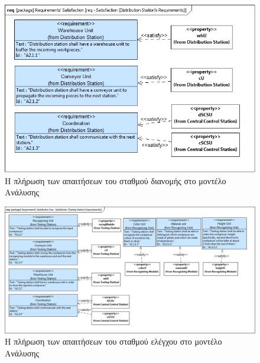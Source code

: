 \documentclass[a4paper,12pt,twoside]{report}
\begin{document}
\begin{appendices}
			\begin{figure}[hp]
					\centering
					\includegraphics[scale=0.30]{AnalysisModel_req-Satisfaction(DistributionStationsRequirements).png}
					\caption{Η πλήρωση των απαιτήσεων του σταθμού διανομής στο μοντέλο Ανάλυσης}
					\label{φωτ:Η πλήρωση των απαιτήσεων του σταθμού διανομής στο μοντέλο Ανάλυσης}
			\end{figure}
			
			\begin{figure}[hp]
					\centering
					\includegraphics[scale=0.30]{AnalysisModel_req-Satisfaction(TestingStationsRequirements).png}
					\caption{Η πλήρωση των απαιτήσεων του σταθμού ελέγχου στο μοντέλο Ανάλυσης}
					\label{φωτ:Η πλήρωση των απαιτήσεων του σταθμού ελέγχου στο μοντέλο Ανάλυσης}
			\end{figure}
			

\end{appendices}
\end{document}
